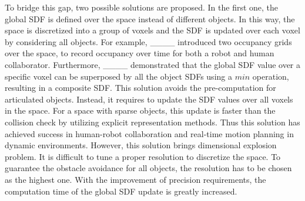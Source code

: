 To bridge this gap, two possible solutions are proposed. In the first one, the global SDF is defined over the space instead of different objects. In this way, the space is discretized into a group of voxels and the SDF is updated over each voxel by considering all objects. For example, ____ introduced two occupancy grids over the space, to record occupancy over time for both a robot and human collaborator.
Furthermore, ____ demonstrated that the global SDF value over a specific voxel can be superposed by all the object SDFs using a $min$ operation, resulting in a composite SDF.
This solution avoids the pre-computation for articulated objects. Instead, it requires to update the SDF values over all voxels in the space. For a space with sparse objects, this update is faster than the collision check by utilizing explicit representation methods. Thus this solution has achieved success in human-robot collaboration and real-time motion planning in dynamic environments.
However, this solution brings dimensional explosion problem. It is difficult to tune a proper resolution to discretize the space. To guarantee the obstacle avoidance for all objects, the resolution has to be chosen as the highest one. With the improvement of precision requirements, the computation time of the global SDF update is greatly increased.

